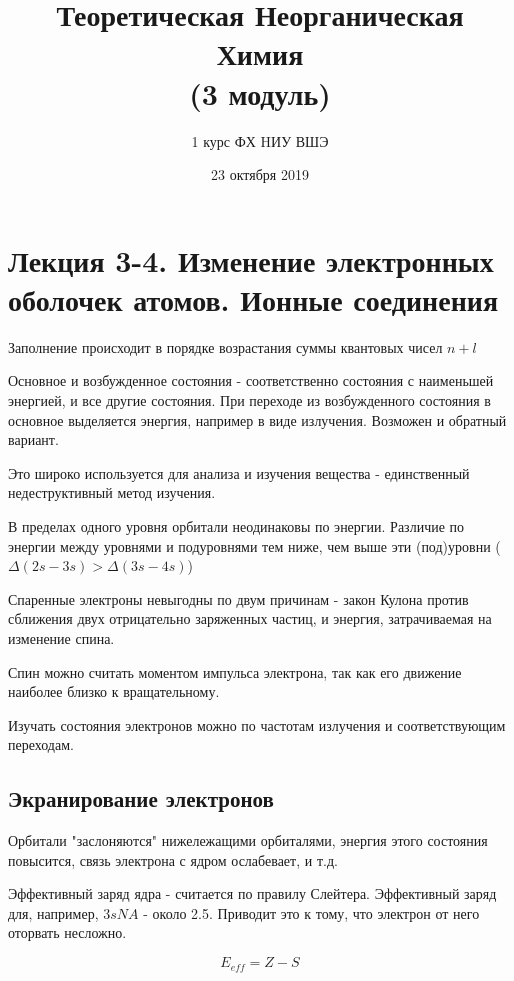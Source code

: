 \documentclass[11pt]{article}
\title{\textbf{Теоретическая Неорганическая Химия}\\ {\normalsize (3 модуль)}}
\author{1 курс ФХ HИУ ВШЭ}
\date{23 октября 2019}
\begin{document}
\begin{titlepage}
\maketitle
\end{titlepage}
\tableofcontents
\section*{Лекция 3-4. Изменение электронных оболочек атомов. Ионные соединения}


Заполнение происходит в порядке возрастания суммы квантовых чисел $n+l$

Основное и возбужденное состояния - соответственно состояния с наименьшей энергией, и все другие состояния. При переходе из возбужденного состояния в основное выделяется энергия, например в виде излучения. Возможен и обратный вариант.

Это широко используется для анализа и изучения вещества - единственный недеструктивный метод изучения.

В пределах одного уровня орбитали неодинаковы по энергии. Различие по энергии между уровнями и подуровнями тем ниже, чем выше эти (под)уровни ($\Delta(2s-3s)>\Delta(3s-4s)$)

Спаренные электроны невыгодны по двум причинам - закон Кулона против сближения двух отрицательно заряженных частиц, и энергия, затрачиваемая на изменение спина.

Спин можно считать моментом импульса электрона, так как его движение наиболее близко к вращательному.

Изучать состояния электронов можно по частотам излучения и соответствующим переходам.
\subsection*{Экранирование электронов}
Орбитали "заслоняются" нижележащими орбиталями, энергия этого состояния повысится, связь электрона с ядром ослабевает, и т.д.

Эффективный заряд ядра - считается по правилу Слейтера. Эффективный заряд для, например, $3s NA$ - около 2.5. Приводит это к тому, что электрон от него оторвать несложно.

$$E_{eff} = Z - S$$
\end{document}
